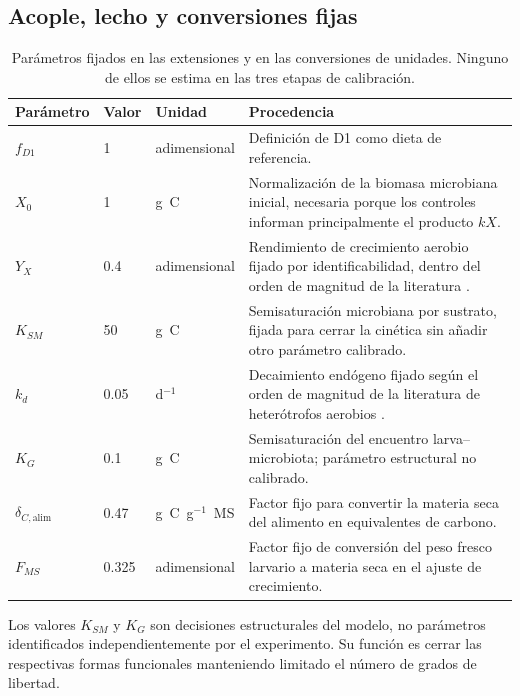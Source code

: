 \subsection*{Acople, lecho y conversiones fijas}

\begin{table}[htbp]
  \centering
  \small
  \caption{Parámetros fijados en las extensiones y en las conversiones de
  unidades. Ninguno de ellos se estima en las tres etapas de calibración.}

  \label{tab:s5-fijos}
  \begin{tabular}{llp{1.8cm}p{6.8cm}}
    \toprule
    Parámetro & Valor & Unidad & Procedencia \\
    \midrule
    $f_{D1}$ & 1 & adimensional & Definición de D1 como dieta de referencia. \\
    $X_0$ & 1 & g~C & Normalización de la biomasa microbiana inicial,
    necesaria porque los controles informan principalmente el producto $kX$. \\
    $Y_X$ & 0.4 & adimensional & Rendimiento de crecimiento aerobio fijado por
    identificabilidad, dentro del orden de magnitud de la literatura
    \parencite{roels1980,shulerbioprocess2017}. \\
    $K_{SM}$ & 50 & g~C & Semisaturación microbiana por sustrato, fijada para
    cerrar la cinética sin añadir otro parámetro calibrado. \\
    $k_d$ & 0.05 & d$^{-1}$ & Decaimiento endógeno fijado según el orden de
    magnitud de la literatura de heterótrofos aerobios \parencite{roels1980}. \\
    $K_G$ & 0.1 & g~C & Semisaturación del encuentro larva--microbiota;
    parámetro estructural no calibrado. \\
    $\delta_{C,\mathrm{alim}}$ & 0.47 & g~C~g$^{-1}$~MS & Factor fijo para
    convertir la materia seca del alimento en equivalentes de carbono. \\
    $F_{MS}$ & 0.325 & adimensional & Factor fijo de conversión del peso
    fresco larvario a materia seca en el ajuste de crecimiento. \\
    \bottomrule
  \end{tabular}
\end{table}

Los valores $K_{SM}$ y $K_G$ son decisiones estructurales del modelo, no
parámetros identificados independientemente por el experimento. Su función es
cerrar las respectivas formas funcionales manteniendo limitado el número de
grados de libertad.


